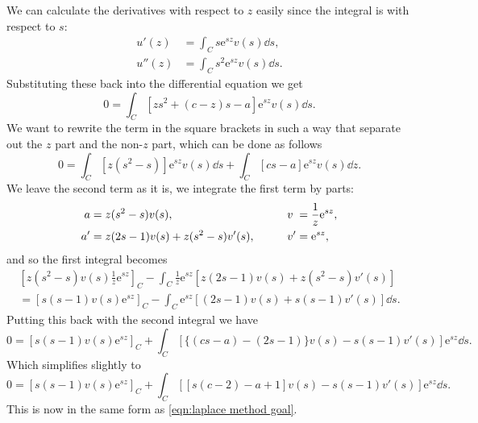 \documentclass[fleqn]{NotesClass}
\newcommand*{\e}{\mathrm{e}}
\begin{document}
    We can calculate the derivatives with respect to \(z\) easily since the integral is with respect to \(s\):
    \begin{align}
        u'(z) &= \int_C s\e^{sz}v(s)\dd{s},\\
        u''(z) &= \int_C s^2\e^{sz}v(s)\dd{s}.
    \end{align}
    Substituting these back into the differential equation we get
    \begin{equation}
        0 = \int_C [zs^2 + (c - z)s - a]\e^{sz}v(s) \dd{s}.
    \end{equation}
    We want to rewrite the term in the square brackets in such a way that separate out the \(z\) part and the non-\(z\) part, which can be done as follows
    \begin{equation}
        0 = \int_C [z(s^2 - s)]\e^{sz}v(s) \dd{s} + \int_C [cs - a]\e^{sz}v(s)\dd{z}.
    \end{equation}
    We leave the second term as it is, we integrate the first term by parts:
    \begin{alignat}{2}
        a &= z(s^2 - s)v(s), \qquad & v\hphantom{'} &= \frac{1}{z}\e^{sz},\\
        a' &= z(2s - 1)v(s) + z(s^2 - s)v'(s), \qquad & v' &= \e^{sz},
    \end{alignat}
    and so the first integral becomes
    \begin{multline}
        \left[ z(s^2 - s)v(s)\frac{1}{z}\e^{sz} \right]_C - \int_C \frac{1}{z}\e^{sz}[z(2s - 1)v(s) + z(s^2 - s)v'(s)]\\
        = [s(s - 1)v(s) \e^{sz}]_C - \int_C \e^{sz}[(2s - 1)v(s) + s(s - 1)v'(s)] \dd{s}.
    \end{multline}
    Putting this back with the second integral we have
    \begin{equation}
        0 = [s(s - 1)v(s)\e^{sz}]_C + \int_C [\{(cs - a) - (2s - 1)\}v(s) - s(s - 1)v'(s)]\e^{sz} \dd{s}.
    \end{equation}
    Which simplifies slightly to
    \begin{equation}
        0 = [s(s - 1)v(s)\e^{sz}]_C + \int_C [[s(c - 2) -a + 1]v(s) - s(s - 1)v'(s)] \e^{sz} \dd{s}.
    \end{equation}
    This is now in the same form as \cref{eqn:laplace method goal}.
    
\end{document}

